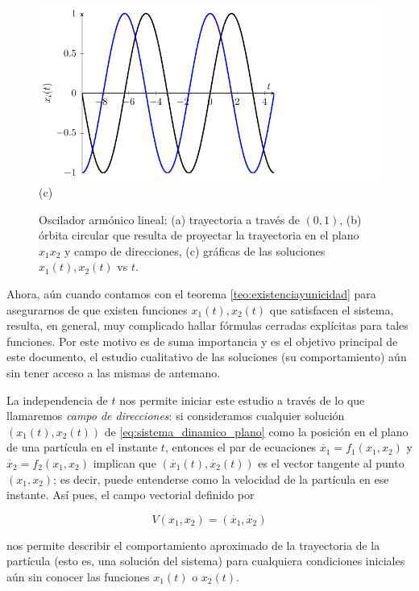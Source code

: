 \begin{figure}
    \includegraphics[scale=1.0]{figures/osciladorarmonico-soluciones.pdf}\\(c) \\
    \caption{Oscilador armónico lineal: (a) trayectoria a través de $(0,1)$, (b) órbita circular que resulta de proyectar la trayectoria en el plano $x_1x_2$ y campo de direcciones, (c) gráficas de las soluciones $x_1(t), x_2(t)$ vs $t$.}
	\label{fig:osciladorarmonico}
\end{figure}

Ahora, aún cuando contamos con el teorema \ref{teo:existenciayunicidad} para asegurarnos de que existen funciones $x_1(t), x_2(t)$ que satisfacen el sistema, resulta, en general, muy complicado hallar fórmulas cerradas explícitas para tales funciones. Por este motivo es de suma importancia y es el objetivo principal de este documento, el estudio cualitativo de las soluciones (su comportamiento) aún sin tener acceso a las mismas de antemano.

La independencia de $t$ nos permite iniciar este estudio a través de lo que llamaremos \emph{campo de direcciones}: si consideramos cualquier solución $(x_1(t),x_2(t))$ de \ref{eq:sistema_dinamico_plano} como la posición en el plano de una partícula en el instante $t$, entonces el par de ecuaciones $\dot{x_1} = f_1(x_1,x_2)$ y $\dot{x_2} = f_2(x_1,x_2)$ implican que $(\dot{x_1}(t),\dot{x_2}(t))$ es el vector tangente al punto $(x_1,x_2)$; es decir, puede entenderse como la velocidad de la partícula en ese instante. Así pues, el campo vectorial definido por 

$$ V(x_1,x_2) = (\dot{x_1}, \dot{x_2})$$

nos permite describir el comportamiento aproximado de la trayectoria de la partícula (esto es, una solución del sistema) para cualquiera condiciones iniciales aún sin conocer las funciones $x_1(t)$ o $x_2(t)$.

